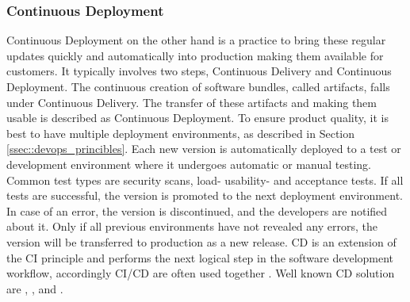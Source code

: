 \documentclass[12pt, a4paper]{article}
\begin{document}
        \subsubsection{Continuous Deployment}
        Continuous Deployment on the other hand is a practice to bring these regular updates quickly and automatically into production making them available for customers. It typically involves two steps, Continuous Delivery and Continuous Deployment. The continuous creation of software bundles, called artifacts, falls under Continuous Delivery. The transfer of these artifacts and making them usable is described as Continuous Deployment. To ensure product quality, it is best to have multiple deployment environments, as described in Section \ref{ssec::devops_princibles}. Each new version is automatically deployed to a test or development environment where it undergoes automatic or manual testing. Common test types are security scans, load- usability- and acceptance tests. If all tests are successful, the version is promoted to the next deployment environment. In case of an error, the version is discontinued, and the developers are notified about it. Only if all previous environments have not revealed any errors, the version will be transferred to production as a new release. \ac{CD} is an extension of the \ac{CI} principle and performs the next logical step in the software development workflow, accordingly \ac{CI}/\ac{CD} are often used together \cite{azuredevops}. Well known \ac{CD} solution are , ,  and .
\end{document}
